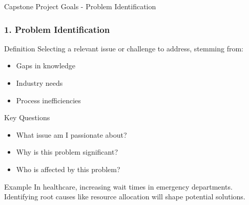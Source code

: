 \documentclass[aspectratio=169]{beamer}
\begin{document}
\begin{frame}[fragile]{Capstone Project Goals - Problem Identification}
    \frametitle{1. Problem Identification}
    \begin{block}{Definition}
        Selecting a relevant issue or challenge to address, stemming from:
    \end{block}
    \begin{itemize}
        \item Gaps in knowledge
        \item Industry needs
        \item Process inefficiencies
    \end{itemize}
    
    \begin{block}{Key Questions}
        \begin{itemize}
            \item What issue am I passionate about?
            \item Why is this problem significant?
            \item Who is affected by this problem?
        \end{itemize}
    \end{block}

    \begin{block}{Example}
        In healthcare, increasing wait times in emergency departments. Identifying root causes like resource allocation will shape potential solutions.
    \end{block}
\end{frame}
\end{document}
